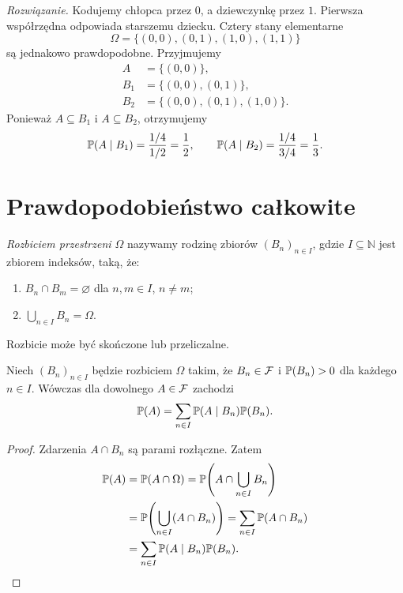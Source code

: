 \noindent\emph{Rozwiązanie.}
Kodujemy chłopca przez $0$, a dziewczynkę przez $1$. Pierwsza współrzędna
odpowiada starszemu dziecku. Cztery stany elementarne
\[
  \Omega=\{(0,0),(0,1),(1,0),(1,1)\}
\]
są jednakowo prawdopodobne. Przyjmujemy
\begin{align*}
  A&=\{(0,0)\},\\
  B_1&=\{(0,0),(0,1)\},\\
  B_2&=\{(0,0),(0,1),(1,0)\}.
\end{align*}
Ponieważ $A\subseteq B_1$ i $A\subseteq B_2$, otrzymujemy
\[
  \mathbb{P}(A\mid B_1)=\frac{1/4}{1/2}=\frac12,
  \qquad
  \mathbb{P}(A\mid B_2)=\frac{1/4}{3/4}=\frac13.
\]

\section{Prawdopodobieństwo całkowite}
\label{sec:calkowite}

\begin{definicja}
\label{def:rozbicie}
\emph{Rozbiciem przestrzeni $\Omega$} nazywamy rodzinę zbiorów
$(B_n)_{n\in I}$, gdzie $I\subseteq\mathbb{N}$ jest zbiorem indeksów,
taką, że:
\begin{enumerate}
  \item $B_n\cap B_m=\varnothing$ dla $n,m\in I$, $n\ne m$;
  \item $\displaystyle\bigcup_{n\in I}B_n=\Omega$.
\end{enumerate}
Rozbicie może być skończone lub przeliczalne.
\end{definicja}

\begin{twierdzenie}
\label{tw:calkowite}
Niech $(B_n)_{n\in I}$ będzie rozbiciem $\Omega$ takim, że
$B_n\in\mathcal{F}$ i $\mathbb{P}(B_n)>0$ dla każdego $n\in I$.
Wówczas dla dowolnego $A\in\mathcal{F}$ zachodzi
\begin{equation}
  \mathbb{P}(A)=\sum_{n\in I}\mathbb{P}(A\mid B_n)\mathbb{P}(B_n).
  \label{eq:calkowite}
\end{equation}
\end{twierdzenie}

\begin{proof}
Zdarzenia $A\cap B_n$ są parami rozłączne. Zatem
\begin{align*}
  \mathbb{P}(A)
    &=\mathbb{P}(A\cap\Omega)
      =\mathbb{P}\!\left(A\cap\bigcup_{n\in I}B_n\right)\\
    &=\mathbb{P}\!\left(\bigcup_{n\in I}(A\cap B_n)\right)
      =\sum_{n\in I}\mathbb{P}(A\cap B_n)\\
    &=\sum_{n\in I}\mathbb{P}(A\mid B_n)\mathbb{P}(B_n).
\end{align*}
\end{proof}

